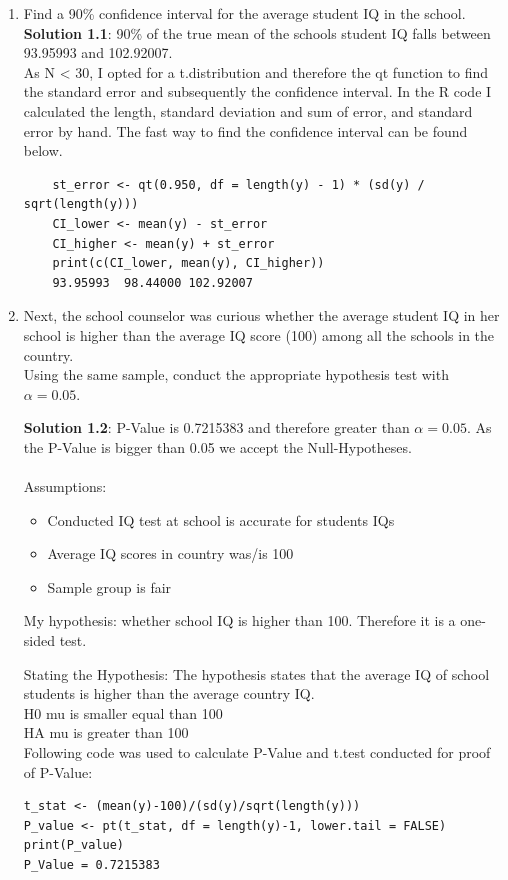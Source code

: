 \documentclass[12pt,letterpaper]{article}
\begin{document}
\begin{enumerate}
	\item Find a 90\% confidence interval for the average student IQ in the school.\\
	
\textbf{Solution 1.1}: 90\% of the true mean of the schools student IQ falls between 93.95993 and 102.92007.\\
As N < 30, I opted for a t.distribution and therefore the qt function to find the standard error and subsequently the confidence interval. In the R code I calculated the length, standard deviation and sum of error, and standard error by hand. The fast way to find the confidence interval can be found below. 

\begin{verbatim}
	st_error <- qt(0.950, df = length(y) - 1) * (sd(y) / sqrt(length(y)))
	CI_lower <- mean(y) - st_error
	CI_higher <- mean(y) + st_error
	print(c(CI_lower, mean(y), CI_higher))
	93.95993  98.44000 102.92007
\end{verbatim}

	
	\item Next, the school counselor was curious  whether  the average student IQ in her school is higher than the average IQ score (100) among all the schools in the country.\\ 
	
	\noindent Using the same sample, conduct the appropriate hypothesis test with $\alpha=0.05$.
	
	\textbf{Solution 1.2}: P-Value is 0.7215383 and therefore greater than $\alpha=0.05$. As the P-Value is bigger than 0.05 we accept the Null-Hypotheses.\\
	\\
	Assumptions:
	\begin{itemize}
		\item Conducted IQ test at school is accurate for students IQs
		\item Average IQ scores in country was/is 100
		\item Sample group is fair
	\end{itemize}
	
My hypothesis: whether school IQ is higher than 100. 
Therefore it is a one-sided test.
	
Stating the Hypothesis: The hypothesis states that the average IQ of school students is higher than the average country IQ.\\
H0 mu is smaller equal than  100 \\
HA mu is greater than 100
\\
Following code was used to calculate P-Value and t.test conducted for proof of P-Value:
\begin{verbatim}
t_stat <- (mean(y)-100)/(sd(y)/sqrt(length(y))) 
P_value <- pt(t_stat, df = length(y)-1, lower.tail = FALSE)
print(P_value)
P_Value = 0.7215383


\end{verbatim}
\end{enumerate}
\end{document}
